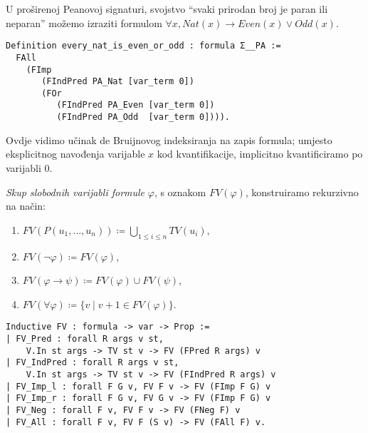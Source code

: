 \begin{example}
  U proširenoj Peanovoj signaturi, svojstvo \enquote{svaki prirodan broj je paran ili neparan}
  možemo izraziti formulom \( \forall x, \mathit{Nat}(x) \rightarrow \mathit{Even}(x) \lor \mathit{Odd}(x) \).
\begin{verbatim}
Definition every_nat_is_even_or_odd : formula Σ__PA :=
  FAll
    (FImp
       (FIndPred PA_Nat [var_term 0])
       (FOr
          (FIndPred PA_Even [var_term 0])
          (FIndPred PA_Odd  [var_term 0]))).
\end{verbatim}
  \noindent Ovdje vidimo učinak de Bruijnovog indeksiranja na zapis formula;
  umjesto eksplicitnog navođenja varijable \(x\) kod kvantifikacije,
  implicitno kvantificiramo po varijabli \(0\).
\end{example}

\begin{definition}
  \textit{Skup slobodnih varijabli formule} \(\varphi\), s oznakom \(\mathit{FV}(\varphi)\), konstruiramo rekurzivno na način:
  \begin{enumerate}
  \item \( \mathit{FV}(P(u_{1}, \ldots, u_{n})) \coloneq \bigcup_{1 \le i \le n} \mathit{TV}(u_{i}) \),
  \item \( \mathit{FV}(\neg\varphi) \coloneq \mathit{FV}(\varphi)\),
  \item \( \mathit{FV}(\varphi \rightarrow \psi) \coloneq \mathit{FV}(\varphi) \cup \mathit{FV}(\psi) \),
  \item \( \mathit{FV(\forall \varphi)} \coloneq \{ v \mid v + 1 \in \mathit{FV}(\varphi) \} \).
  \end{enumerate}
\begin{verbatim}
Inductive FV : formula -> var -> Prop :=
| FV_Pred : forall R args v st,
    V.In st args -> TV st v -> FV (FPred R args) v
| FV_IndPred : forall R args v st,
    V.In st args -> TV st v -> FV (FIndPred R args) v
| FV_Imp_l : forall F G v, FV F v -> FV (FImp F G) v
| FV_Imp_r : forall F G v, FV G v -> FV (FImp F G) v
| FV_Neg : forall F v, FV F v -> FV (FNeg F) v
| FV_All : forall F v, FV F (S v) -> FV (FAll F) v.
\end{verbatim}
\end{definition}

